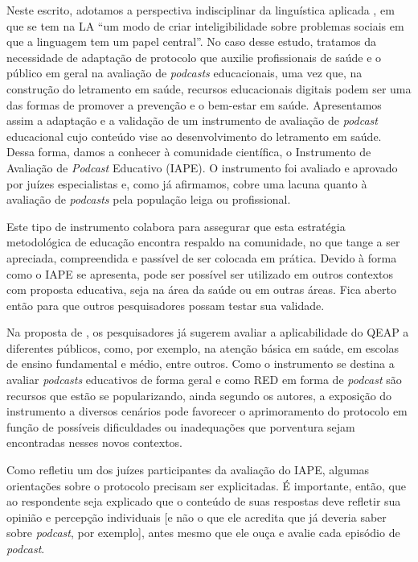 Neste escrito, adotamos a perspectiva indisciplinar da linguística aplicada
\cite[p. 14]{moita2006}, em que se tem na LA \enquote{um modo de criar
inteligibilidade sobre problemas sociais em que a linguagem tem um papel
central}. No caso desse estudo, tratamos da necessidade de adaptação de
protocolo que auxilie profissionais de saúde e o público em geral na avaliação
de \textit{podcasts} educacionais, uma vez que, na construção do letramento em
saúde, recursos educacionais digitais podem ser uma das formas de promover a
prevenção e o bem-estar em saúde. Apresentamos assim a adaptação e a validação
de um instrumento de avaliação de \textit{podcast} educacional cujo conteúdo
vise ao desenvolvimento do letramento em saúde. Dessa forma, damos a conhecer à
comunidade científica, o Instrumento de Avaliação de \textit{Podcast} Educativo
(IAPE). O instrumento foi avaliado e aprovado por juízes especialistas e, como
já afirmamos, cobre uma lacuna quanto à avaliação de \textit{podcasts} pela
população leiga ou profissional.

Este tipo de instrumento colabora para assegurar que esta estratégia
metodológica de educação encontra respaldo na comunidade, no que tange a ser
apreciada, compreendida e passível de ser colocada em prática. Devido à forma
como o IAPE se apresenta, pode ser possível ser utilizado em outros contextos
com proposta educativa, seja na área da saúde ou em outras áreas. Fica aberto
então para que outros pesquisadores possam testar sua validade. 

Na proposta de \textcite{alarcon2020}, os pesquisadores já sugerem avaliar a
aplicabilidade do QEAP a diferentes públicos, como, por exemplo, na atenção
básica em saúde, em escolas de ensino fundamental e médio, entre outros. Como o
instrumento se destina a avaliar \textit{podcasts} educativos de forma geral e
como RED em forma de \textit{podcast} são recursos que estão se popularizando,
ainda segundo os autores, a exposição do instrumento a diversos cenários pode
favorecer o aprimoramento do protocolo em função de possíveis dificuldades ou
inadequações que porventura sejam encontradas nesses novos contextos.  

Como refletiu um dos juízes participantes da avaliação do IAPE, algumas
orientações sobre o protocolo precisam ser explicitadas. É importante, então,
que ao respondente seja explicado que o conteúdo de suas respostas deve
refletir sua opinião e percepção individuais [e não o que ele acredita que já
deveria saber sobre \textit{podcast}, por exemplo], antes mesmo que ele  ouça e
avalie cada episódio de \textit{podcast}. 


